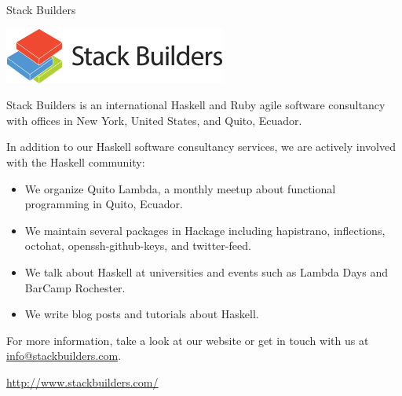\documentclass[DIV16,twocolumn,10pt]{scrreprt}
\begin{document}
\begin{hcarentry}{Stack Builders}
\makeheader

\begin{center}
  \includegraphics[scale=0.5]{hcar-28-stackbuilders.png}
\end{center}

Stack Builders is an international Haskell and Ruby agile software
consultancy with offices in New York, United States, and Quito,
Ecuador.

In addition to our Haskell software consultancy services, we are
actively involved with the Haskell community:

\begin{itemize}
\item
  We organize Quito Lambda, a monthly meetup about functional
  programming in Quito, Ecuador.

\item
  We maintain several packages in Hackage including hapistrano,
  inflections, octohat, openssh-github-keys, and twitter-feed.

\item
  We talk about Haskell at universities and events such as Lambda Days
  and BarCamp Rochester.

\item
  We write blog posts and tutorials about Haskell.

\end{itemize}

For more information, take a look at our website or get in touch with
us at \href{mailto:info@stackbuilders.com}{info@stackbuilders.com}.

\FurtherReading
\url{http://www.stackbuilders.com/}
\end{hcarentry}
\end{document}

